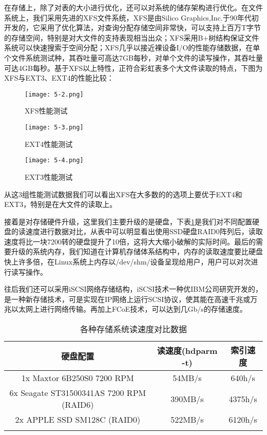 在存储上，除了对表的大小进行优化，还可以对系统的储存架构进行优化。在文件系统上，我们采用先进的XFS文件系统，XFS是由Silico Graphics,Inc.于90年代初开发的，它采用了优化算法，对查询分配存储空间非常快，可以支持上百万T字节的存储空间，特别是对大文件的支持表现相当出众；XFS采用B+树结构保证文件系统可以快速搜索于空间分配；XFS几乎以接近裸设备I/O的性能存储数据，在单个文件系统测试种，其吞吐量可高达7GB每秒，对单个文件的读写操作，其吞吐量可达4GB每秒。基于XFS以上特性，正符合彩虹表多个大文件读取的特点，下图为XFS与EXT3、EXT4的性能比较：
\begin{figure}[!ht]
\centering
\texttt{[image: 5-2.png]}
\caption{XFS性能测试}
\label{fig:5.2}
\end{figure}
\begin{figure}[!ht]
\centering
\texttt{[image: 5-3.png]}
\caption{EXT4性能测试}
\end{figure}
\begin{figure}[!ht]
\centering
\texttt{[image: 5-4.png]}
\caption{EXT3性能测试}
\end{figure}

从这3组性能测试数据我们可以看出XFS在大多数的的选项上要优于EXT4和EXT3，特别是在大文件的读取上。

接着是对存储硬件升级，这里我们主要升级的是硬盘，下表\ref{tab:5.1}是我们对不同配置硬盘的读速度进行数据对比，从表中可以明显看出使用SSD硬盘RAID0阵列后，读取速度将比一块7200转的硬盘提升了10倍，这将大大缩小破解的实际时间。最后的需要升级的系统内存，我们知道在计算机存储体系结构中，内存的读取速度要比硬盘快上许多倍，在Linux系统上内存以/dev/shm/设备呈现给用户，用户可以对次进行读写操作。

往后我们还可以采用iSCSI网络存储结构，iSCSI技术一种优IBM公司研究开发的，是一种新存储技术，可是实现在IP网络上运行SCSI协议，使其能在高速千兆或万兆以太网上进行网络传输。再加上FCoE技术，可以达到几Gb/s的存储速度。
\begin{longtable}{@{\extracolsep{\fill}}ccc}
\caption{各种存储系统读速度对比数据}\\\toprule[1pt]
\multicolumn{1}{c}{硬盘配置} & 
\multicolumn{1}{c}{读速度(hdparm -t)} &
\multicolumn{1}{c}{索引速度} \\\midrule
1x Maxtor 6B250S0 7200 RPM & 54MB/s & 640h/s \\
6x Seagate ST31500341AS 7200 RPM (RAID6) & 390MB/s & 4375h/s \\
2x APPLE SSD SM128C (RAID0) & 522MB/s & 6120h/s \\
\bottomrule[1pt]
\label{tab:5.1}
\end{longtable}

